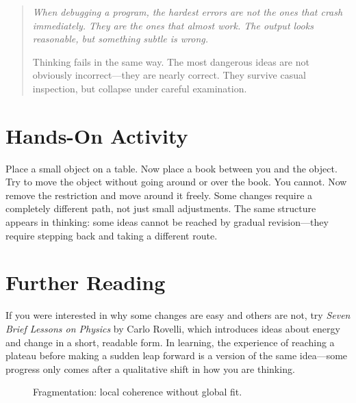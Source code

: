 \documentclass[11pt]{book}
\theoremstyle{definition}
\theoremstyle{remark}
\newenvironment{literaryaside}
  {\begin{quote}\small\itshape}
  {\end{quote}}
\begin{document}
\begin{literaryaside}
When debugging a program, the hardest errors are not the ones that
crash immediately. They are the ones that almost work. The output looks
reasonable, but something subtle is wrong.

Thinking fails in the same way. The most dangerous ideas are not
obviously incorrect---they are nearly correct. They survive casual
inspection, but collapse under careful examination.
\end{literaryaside}

\section*{Hands-On Activity}

Place a small object on a table. Now place a book between you and the
object. Try to move the object without going around or over the book.
You cannot. Now remove the restriction and move around it freely.
Some changes require a completely different path, not just small
adjustments. The same structure appears in thinking: some ideas cannot
be reached by gradual revision---they require stepping back and taking
a different route.

\section*{Further Reading}

If you were interested in why some changes are easy and others are not,
try \textit{Seven Brief Lessons on Physics} by Carlo Rovelli, which
introduces ideas about energy and change in a short, readable form.
In learning, the experience of reaching a plateau before making a
sudden leap forward is a version of the same idea---some progress only
comes after a qualitative shift in how you are thinking.

\begin{figure}[h]
\centering
{}
\caption{Fragmentation: local coherence without global fit.}
\end{figure}
\end{document}
